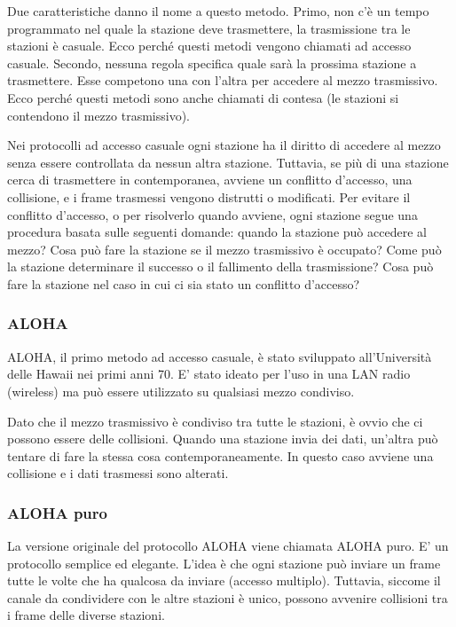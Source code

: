 Due caratteristiche danno il nome a questo metodo. Primo, non c'è un tempo programmato nel quale la stazione deve trasmettere, la trasmissione tra le stazioni è casuale. Ecco perché questi metodi vengono chiamati ad accesso casuale. Secondo, nessuna regola specifica quale sarà la prossima stazione a trasmettere. Esse competono una con l'altra per accedere al mezzo trasmissivo. Ecco perché questi metodi sono anche chiamati di contesa (le stazioni si contendono il mezzo trasmissivo).

Nei protocolli ad accesso casuale ogni stazione ha il diritto di accedere al mezzo senza essere controllata da nessun altra stazione. Tuttavia, se più di una stazione cerca di trasmettere in contemporanea, avviene un conflitto d'accesso, una collisione, e i frame trasmessi vengono distrutti o modificati. Per evitare il conflitto d'accesso, o per risolverlo quando avviene, ogni stazione segue una procedura basata sulle seguenti domande: quando la stazione può accedere al mezzo? Cosa può fare la stazione se il mezzo trasmissivo è occupato? Come può la stazione determinare il successo o il fallimento della trasmissione? Cosa può fare la stazione nel caso in cui ci sia stato un conflitto d'accesso?

\subsubsection{ALOHA}
ALOHA, il primo metodo ad accesso casuale, è stato sviluppato all'Università delle Hawaii nei primi anni 70. E' stato ideato per l'uso in una LAN radio (wireless) ma può essere utilizzato su qualsiasi mezzo condiviso.

Dato che il mezzo trasmissivo è condiviso tra tutte le stazioni, è ovvio che ci possono essere delle collisioni. Quando una stazione invia dei dati, un'altra può tentare di fare la stessa cosa contemporaneamente. In questo caso avviene una collisione e i dati trasmessi sono alterati.

\subsubsection{ALOHA puro}
La versione originale del protocollo ALOHA viene chiamata ALOHA puro. E' un protocollo semplice ed elegante. L'idea è che ogni stazione può inviare un frame tutte le volte che ha qualcosa da inviare (accesso multiplo). Tuttavia, siccome il canale da condividere con le altre stazioni è unico, possono avvenire collisioni tra i frame delle diverse stazioni. 

